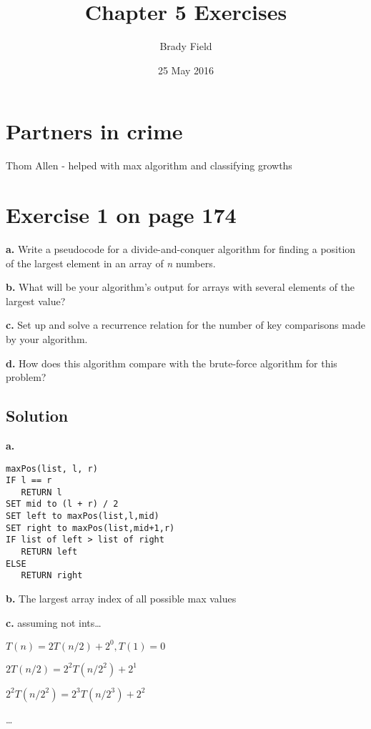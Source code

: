 \documentclass[11pt]{article}
\title{Chapter 5 Exercises}
\author{Brady Field}
\date{25 May 2016}
\begin{document}
\maketitle



\section*{Partners in crime}
\label{sec-1}

Thom Allen - helped with max algorithm and classifying growths

\section*{Exercise 1 on page 174}
\label{sec-2}


\textbf{a.} Write a pseudocode for a divide-and-conquer algorithm for finding
a position of the largest element in an array of \emph{n} numbers.

\textbf{b.} What will be your algorithm's output for arrays with several
elements of the largest value?

\textbf{c.} Set up and solve a recurrence relation for the number of key
comparisons made by your algorithm.

\textbf{d.} How does this algorithm compare with the brute-force algorithm
for this problem?

\subsection*{Solution}
\label{sec-2.1}

\textbf{a.}

\begin{verbatim}
maxPos(list, l, r)
IF l == r
   RETURN l
SET mid to (l + r) / 2
SET left to maxPos(list,l,mid)
SET right to maxPos(list,mid+1,r)
IF list of left > list of right
   RETURN left
ELSE
   RETURN right

\end{verbatim}


\textbf{b.} The largest array index of all possible max values

\textbf{c.} assuming not ints\ldots{}

\(T(n) = 2T(n/2) + 2^0, T(1) = 0\)

\(2T(n/2) = 2^2T(n/2^2) + 2^1\)

\(2^2T(n/2^2) = 2^3T(n/2^3) + 2^2\)

\ldots{}
\end{document}
